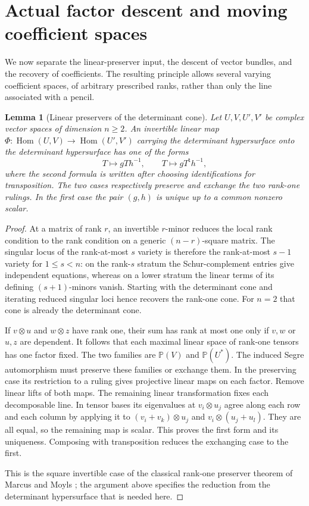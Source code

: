 \documentclass[11pt,reqno]{amsart}
\numberwithin{equation}{section}
\newtheorem{lemma}[theorem]{Lemma}
\theoremstyle{definition}\newtheorem{definition}[theorem]{Definition}
\theoremstyle{remark}\newtheorem{remark}[theorem]{Remark}
\newcommand{\Pj}{\mathbb P}\newcommand{\A}{\mathbb A}
\DeclareMathOperator{\Hom}{Hom}\DeclareMathOperator{\Tot}{Tot}
\begin{document}
\section{Actual factor descent and moving coefficient spaces}
\label{sec:coefficient-descent-v147}

We now separate the linear-preserver input, the descent of vector
bundles, and the recovery of coefficients.  The resulting principle
allows several varying coefficient spaces, of arbitrary prescribed
ranks, rather than only the line associated with a pencil.

\begin{lemma}[Linear preservers of the determinant cone]
\label{lem:linear-preserver-v147}
Let \(U,V,U',V'\) be complex vector spaces of dimension \(n\ge2\).
An invertible linear map
\(\Phi:\Hom(U,V)\to\Hom(U',V')\) carrying the determinant
hypersurface onto the determinant hypersurface has one of the forms
\[
 T\longmapsto gTh^{-1},\qquad
 T\longmapsto gT^{\mathsf t}h^{-1},
\]
where the second formula is written after choosing identifications
for transposition.  The two cases respectively preserve and exchange
the two rank-one rulings.  In the first case the pair \((g,h)\)
is unique up to a common nonzero scalar.
\end{lemma}
\begin{proof}
At a matrix of rank \(r\), an invertible \(r\)-minor reduces the
local rank condition to the rank condition on a generic
\((n-r)\)-square matrix.  The singular locus of the rank-at-most
\(s\) variety is therefore the rank-at-most \(s-1\) variety for
\(1\le s<n\): on the rank-\(s\) stratum the Schur-complement
entries give independent equations, whereas on a lower stratum the
linear terms of its defining \((s+1)\)-minors vanish.  Starting
with the determinant cone and iterating reduced singular loci hence
recovers the rank-one cone.  For \(n=2\) that cone is already the
determinant cone.

If \(v\otimes u\) and \(w\otimes z\) have rank one, their sum
has rank at most one only if \(v,w\) or \(u,z\) are dependent.
It follows that each maximal linear space of rank-one tensors has
one factor fixed.  The two families are
\(\Pj(V)\) and \(\Pj(U^*)\).  The induced Segre automorphism
must preserve these families or exchange them.  In the preserving
case its restriction to a ruling gives projective linear maps on
each factor.  Remove linear lifts of both maps.  The remaining
linear transformation fixes each decomposable line.  In tensor bases
its eigenvalues at \(v_i\otimes u_j\) agree along each row and
each column by applying it to
\((v_i+v_k)\otimes u_j\) and \(v_i\otimes(u_j+u_l)\).
They are all equal, so the remaining map is scalar.  This proves
the first form and its uniqueness.  Composing with transposition
reduces the exchanging case to the first.

This is the square invertible case of the classical rank-one
preserver theorem of Marcus and Moyls
\cite[Theorem~1, pp.~1218--1219]{MarcusMoyls}; the argument above
specifies the reduction from the determinant hypersurface that is
needed here.
\end{proof}
\end{document}
